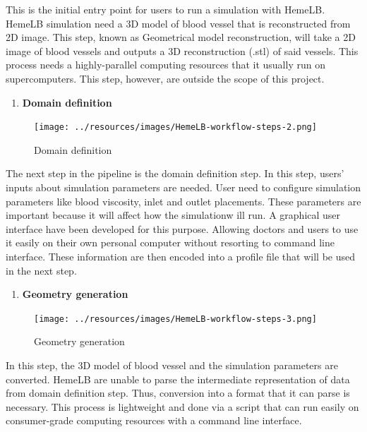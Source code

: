 \documentclass[]{article}
\providecommand{\tightlist}{%
  \setlength{\itemsep}{0pt}\setlength{\parskip}{0pt}}
\begin{document}
This is the initial entry point for users to run a simulation with
HemeLB. HemeLB simulation need a 3D model of blood vessel that is
reconstructed from 2D image. This step, known as Geometrical model
reconstruction, will take a 2D image of blood vessels and outputs a 3D
reconstruction (.stl) of said vessels. This process needs a
highly-parallel computing resources that it usually run on
supercomputers. This step, however, are outside the scope of this
project.

\begin{enumerate}
\def\labelenumi{\arabic{enumi}.}
\setcounter{enumi}{1}
\tightlist
\item
  \textbf{Domain definition}
\end{enumerate}

\begin{figure}[H]
\centering
\texttt{[image: ../resources/images/HemeLB-workflow-steps-2.png]}
\caption{Domain definition}
\end{figure}

The next step in the pipeline is the domain definition step. In this
step, users' inputs about simulation parameters are needed. User need to
configure simulation parameters like blood viscosity, inlet and outlet
placements. These parameters are important because it will affect how
the simulationw ill run. A graphical user interface have been developed
for this purpose. Allowing doctors and users to use it easily on their
own personal computer without resorting to command line interface. These
information are then encoded into a profile file that will be used in
the next step.

\begin{enumerate}
\def\labelenumi{\arabic{enumi}.}
\setcounter{enumi}{2}
\tightlist
\item
  \textbf{Geometry generation}
\end{enumerate}

\begin{figure}[H]
\centering
\texttt{[image: ../resources/images/HemeLB-workflow-steps-3.png]}
\caption{Geometry generation}
\end{figure}

In this step, the 3D model of blood vessel and the simulation parameters
are converted. HemeLB are unable to parse the intermediate
representation of data from domain definition step. Thus, conversion
into a format that it can parse is necessary. This process is
lightweight and done via a script that can run easily on consumer-grade
computing resources with a command line interface.
\end{document}
